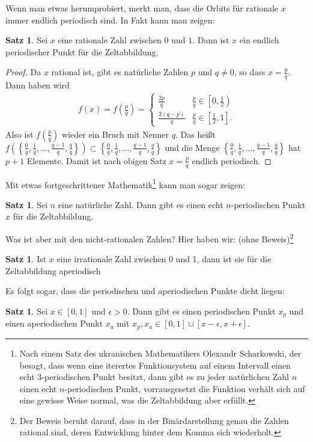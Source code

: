 \documentclass[a4paper,ngerman,12pt]{zirkelblatt1415}
\theoremstyle{definition}
\newtheorem{satz}[definition]{Satz}
\theoremstyle{remark}
\begin{document}
Wenn man etwas herumprobiert, merkt man, dass die Orbits für rationale $x$ immer endlich periodisch sind. In Fakt kann man zeigen:
\begin{satz}
Sei $x$ eine rationale Zahl zwischen $0$ und $1$. Dann ist $x$ ein endlich periodischer Punkt für die Zeltabbildung. 
\end{satz}
\begin{proof}
Da $x$ rational ist, gibt es natürliche Zahlen $p$ und $q\neq 0$, so dass $x=\frac{p}{q}$. Dann haben wird
\begin{align*}
 f(x) = f\left(\frac{p}{q}\right)=
 \begin{cases}
\frac{2p}{q} & \frac{p}{q}\in \left[0,\frac{1}{2}\right) \\
\frac{2(q-p)}{q} & \frac{p}{q}\in \left[\frac{1}{2},1\right].
\end{cases}
\end{align*}
Also ist $f\left(\frac{p}{q}\right)$ wieder ein Bruch mit Nenner $q$. Das heißt $f\left(\left\{\frac{0}{q},\frac{1}{q},\ldots,\frac{q-1}{q},\frac{q}{q} \right\}\right)\subset \left\{\frac{0}{q},\frac{1}{q},\ldots,\frac{q-1}{q},\frac{q}{q} \right\}$ und die 
Menge $\left\{\frac{0}{q},\frac{1}{q},\ldots,\frac{q-1}{q},\frac{q}{q} \right\}$ hat $p+1$ Elemente. Damit ist nach obigen Satz $x=\frac{p}{q}$ endlich periodisch.
\end{proof}
Mit etwas fortgeschrittener Mathematik\footnote{Nach einem Satz des ukranischen Mathematikers Olexandr Scharkowski, der besagt, dass wenn eine iterertes Funktionsystem auf einem Intervall einen echt 3-periodischen Punkt besitzt, dann gibt es zu jeder natürlichen Zahl $n$ einen echt $n$-periodischen Punkt, vorrausgesetzt die Funktion verhält sich auf eine gewisse Weise normal, was die Zeltabbildung aber erfüllt.} kann man sogar zeigen:
\begin{satz}
Sei $n$ eine natürliche Zahl. Dann gibt es einen echt $n$-periodischen Punkt $x$ für die Zeltabbildung. 
\end{satz}
Was ist aber mit den nicht-rationalen Zahlen?
Hier haben wir: (ohne Beweis)\footnote{Der Beweis beruht darauf, dass in der Binärdarstellung genau die Zahlen rational sind, deren Entwicklung hinter dem Komma sich wiederholt.}
\begin{satz}
Ist $x$ eine irrationale Zahl zwischen 0 und 1, dann ist sie für die Zeltabbildung aperiodisch
\end{satz}
Es folgt sogar, dass die periodischen und aperiodischen Punkte dicht liegen:
\begin{satz}
Sei $x\in[0,1]$ und $\epsilon>0$. Dann gibt es einen periodischen Punkt $x_p$ und einen aperiodischen Punkt $x_a$ mit $x_p, x_a \in [0,1] \cup [x-\epsilon,x+\epsilon]$. 
\end{satz}
\end{document}

